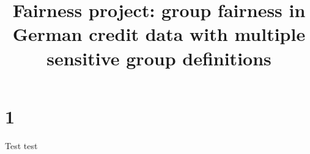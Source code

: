 \documentclass{article}
\title{Fairness project: group fairness in German credit data with multiple sensitive group definitions}
\begin{document}
\maketitle

\section*{1}

Test test \cite{stanley}

\printbibliography
\end{document}
